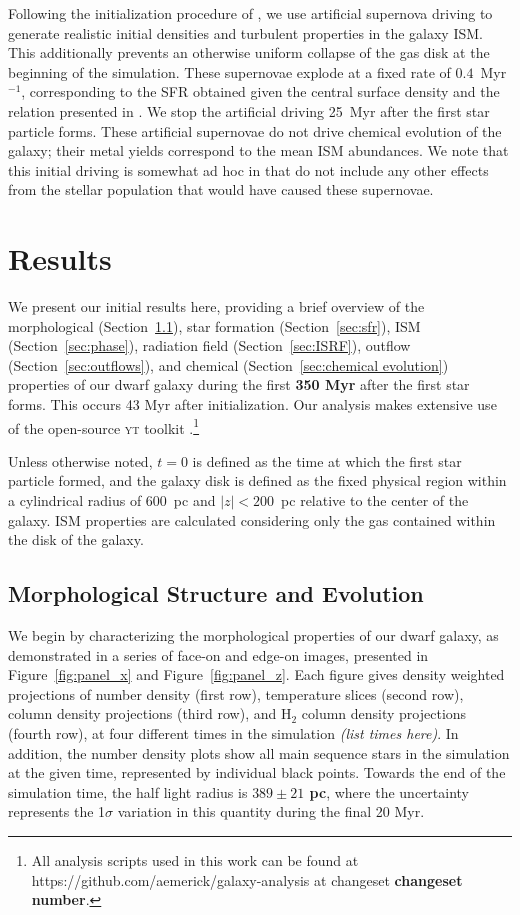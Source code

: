 \documentclass[twocolumn]{aastex61}
\begin{document}
Following the initialization procedure of \citet{Hu2017}, we use artificial supernova driving to generate realistic initial densities and turbulent properties in the galaxy ISM. This additionally prevents an otherwise uniform collapse of the gas disk at the beginning of the simulation. These supernovae explode at a fixed rate of $0.4$~Myr$^{-1}$, corresponding to the SFR obtained given the central  surface density and the relation presented in \citep{Roychowdhury2009}. We stop the artificial driving 25~Myr after the first star particle forms. These artificial supernovae do not drive chemical evolution of the galaxy; their metal yields correspond to the mean ISM abundances. We note that this initial driving is somewhat ad hoc in that do not include any other effects from the stellar population that would have caused these supernovae.

\section{Results}
\label{sec:results}
We present our initial results here, providing a brief overview of the morphological (Section~\ref{sec:structure}), star formation (Section~\ref{sec:sfr}), ISM (Section~\ref{sec:phase}), radiation field (Section~\ref{sec:ISRF}), outflow (Section~\ref{sec:outflows}), and chemical (Section~\ref{sec:chemical evolution}) properties of our dwarf galaxy during the first \textbf{350 Myr} after the first star forms. This occurs 43 Myr after initialization. Our analysis makes extensive use of the open-source \textsc{yt} toolkit \citep{yt}.\footnote{All analysis scripts used in this work can be found at https://github.com/aemerick/galaxy-analysis at changeset \textbf{changeset number}.}

Unless otherwise noted, $t = 0$ is defined as the time at which the first star particle formed, and the galaxy disk is defined as the fixed physical region within a cylindrical radius of 600~pc and $|z| < 200$~pc relative to the center of the galaxy. ISM properties are calculated considering only the gas contained within the disk of the galaxy.

\subsection{Morphological Structure and Evolution}
\label{sec:structure}

We begin by characterizing the morphological properties of our dwarf galaxy, as demonstrated in a series of face-on and edge-on images, presented in Figure~\ref{fig:panel_x} and Figure~\ref{fig:panel_z}. Each figure gives density weighted projections of number density (first row), temperature slices (second row),  column density projections (third row), and H$_2$ column density projections (fourth row), at four different times in the simulation \textit{(list times here)}. In addition, the number density plots show all main sequence stars in the simulation at the given time, represented by individual black points. Towards the end of the simulation time, the half light radius is \textbf{$389 \pm 21$ pc}, where the uncertainty represents the 1$\sigma$ variation in this quantity during the final 20 Myr.
\end{document}
